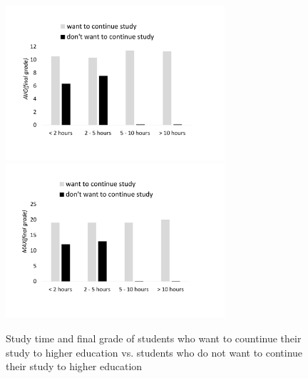 \documentclass{article}
\begin{document}
\begin{figure}%
	\centering
	\includegraphics[width=3.2in]{figures/AVG_STUDENT}
	\includegraphics[width=3.2in]{figures/MAX_STUDENT}
	\caption{Study time and final grade of students who want to countinue their study to higher education vs. students who do not want to continue their study to higher education}%
	\label{fig:motivation_dataset}%
\end{figure}
\end{document}
